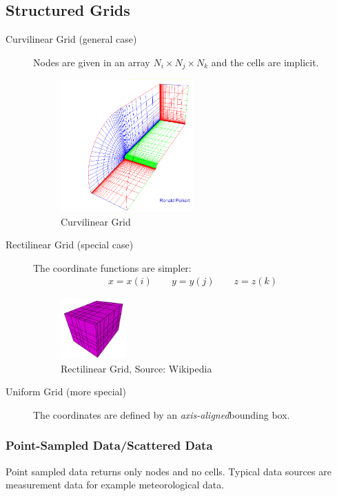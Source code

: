 \subsection{Structured Grids}
\begin{description}
    \item[Curvilinear Grid (general case)] Nodes are given in an array $N_i\times N_j\times N_k$ and the cells are implicit.
    \begin{figure}[H]
        \centering
        \includegraphics[width=0.5\textwidth]{img/01_curvilinear_grid}
        \caption{Curvilinear Grid}
    \end{figure}

    \item[Rectilinear Grid (special case)] The coordinate functions are simpler:
        \begin{align*}
            x = x(i)\qquad
            y = y(j)\qquad
            z = z(k)
        \end{align*}
        \begin{figure}[H]
            \centering
            \includegraphics[width=0.25\textwidth]{img/01_rectilinear_grid_wikipedia}
            \caption{Rectilinear Grid, Source: Wikipedia}
        \end{figure}

     \item[Uniform Grid (more special)] The coordinates are defined by an \emph{axis-aligned}bounding box.
\end{description}

\subsubsection{Point-Sampled Data/Scattered Data}
Point sampled data  returns only nodes and no cells. Typical data sources are measurement data for example meteorological data.

